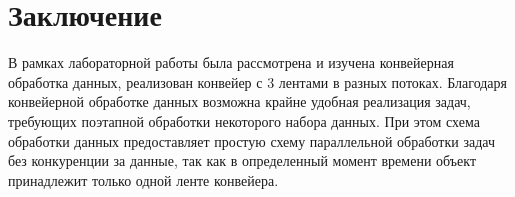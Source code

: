 \chapter*{Заключение}

В рамках лабораторной работы была рассмотрена и изучена конвейерная обработка данных, реализован конвейер с 3 лентами в разных потоках. Благодаря конвейерной обработке данных возможна крайне удобная реализация задач, требующих поэтапной обработки некоторого набора данных. При этом схема обработки данных предоставляет простую схему параллельной обработки задач без конкуренции за данные, так как в определенный момент времени объект принадлежит только одной ленте конвейера.
